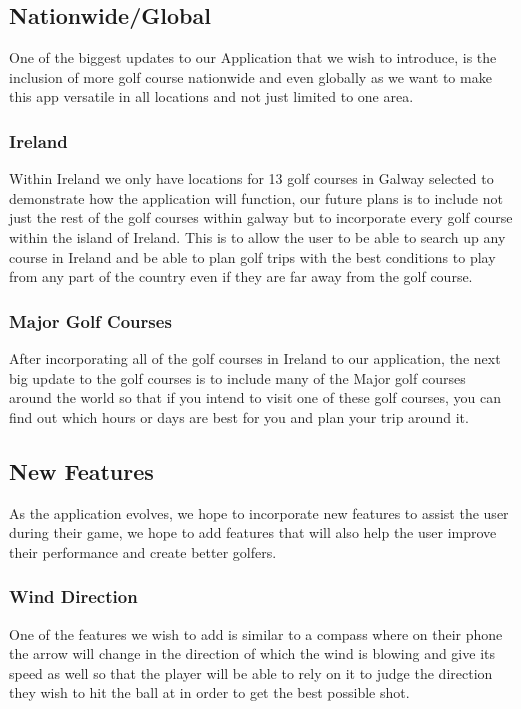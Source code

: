 \subsection{Nationwide/Global}
One of the biggest updates to our Application that we wish to introduce, is the inclusion of more golf course nationwide and even globally as we want to make this app versatile in all locations and not just limited to one area.
\subsubsection{Ireland}
Within Ireland we only have locations for 13 golf courses in Galway selected to demonstrate how the application will function, our future plans is to include not just the rest of the golf courses within galway but to incorporate every golf course within the island of Ireland. This is to allow the user to be able to search up any course in Ireland and be able to plan golf trips with the best conditions to play from any part of the country even if they are far away from the golf course.
\subsubsection{Major Golf Courses}
After incorporating all of the golf courses in Ireland to our application, the next big update to the golf courses is to include many of the Major golf courses around the world so that if you intend to visit one of these golf courses, you can find out which hours or days are best for you and plan your trip around it.
\subsection{New Features}
As the application evolves, we hope to incorporate new features to assist the user during their game, we hope to add features that will also help the user improve their performance and create better golfers.
\subsubsection{Wind Direction}
One of the features we wish to add is similar to a compass where on their phone the arrow will change in the direction of which the wind is blowing and give its speed as well so that the player will be able to rely on it to judge the direction they wish to hit the ball at in order to get the best possible shot.
